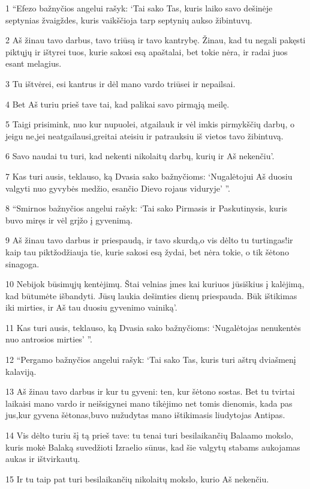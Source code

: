 \par 1 “Efezo bažnyčios angelui rašyk: ‘Tai sako Tas, kuris laiko savo dešinėje septynias žvaigždes, kuris vaikščioja tarp septynių aukso žibintuvų. 
\par 2 Aš žinau tavo darbus, tavo triūsą ir tavo kantrybę. Žinau, kad tu negali pakęsti piktųjų ir ištyrei tuos, kurie sakosi esą apaštalai, bet tokie nėra, ir radai juos esant melagius. 
\par 3 Tu ištvėrei, esi kantrus ir dėl mano vardo triūsei ir nepailsai. 
\par 4 Bet Aš turiu prieš tave tai, kad palikai savo pirmąją meilę. 
\par 5 Taigi prisimink, nuo kur nupuolei, atgailauk ir vėl imkis pirmykščių darbų, o jeigu ne,­jei neatgailausi,­greitai ateisiu ir patrauksiu iš vietos tavo žibintuvą. 
\par 6 Savo naudai tu turi, kad nekenti nikolaitų darbų, kurių ir Aš nekenčiu’. 
\par 7 Kas turi ausis, teklauso, ką Dvasia sako bažnyčioms: ‘Nugalėtojui Aš duosiu valgyti nuo gyvybės medžio, esančio Dievo rojaus viduryje’ ”. 
\par 8 “Smirnos bažnyčios angelui rašyk: ‘Tai sako Pirmasis ir Paskutinysis, kuris buvo miręs ir vėl grįžo į gyvenimą. 
\par 9 Aš žinau tavo darbus ir priespaudą, ir tavo skurdą,­o vis dėlto tu turtingas!­ir kaip tau piktžodžiauja tie, kurie sakosi esą žydai, bet nėra tokie, o tik šėtono sinagoga. 
\par 10 Nebijok būsimųjų kentėjimų. Štai velnias įmes kai kuriuos jūsiškius į kalėjimą, kad būtumėte išbandyti. Jūsų laukia dešimties dienų priespauda. Būk ištikimas iki mirties, ir Aš tau duosiu gyvenimo vainiką’. 
\par 11 Kas turi ausis, teklauso, ką Dvasia sako bažnyčioms: ‘Nugalėtojas nenukentės nuo antrosios mirties’ ”. 
\par 12 “Pergamo bažnyčios angelui rašyk: ‘Tai sako Tas, kuris turi aštrų dviašmenį kalaviją. 
\par 13 Aš žinau tavo darbus ir kur tu gyveni: ten, kur šėtono sostas. Bet tu tvirtai laikaisi mano vardo ir neišsigynei mano tikėjimo net tomis dienomis, kada pas jus,­kur gyvena šėtonas,­buvo nužudytas mano ištikimasis liudytojas Antipas. 
\par 14 Vis dėlto turiu šį tą prieš tave: tu tenai turi besilaikančių Balaamo mokslo, kuris mokė Balaką suvedžioti Izraelio sūnus, kad šie valgytų stabams aukojamas aukas ir ištvirkautų. 
\par 15 Ir tu taip pat turi besilaikančių nikolaitų mokslo, kurio Aš nekenčiu. 
